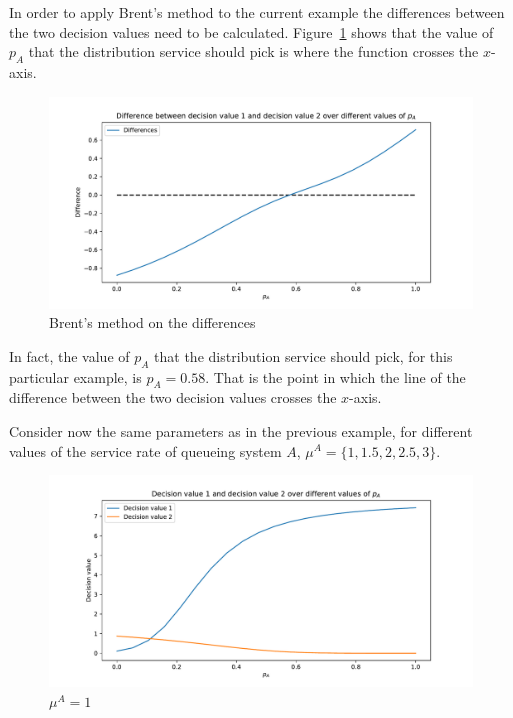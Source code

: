 In order to apply Brent's method to the current example the differences between
the two decision values need to be calculated.
Figure~\ref{fig:brent_method_diffs} shows that the value of \(p_A\) that the
distribution service should pick is where the function crosses the \(x\)-axis.

\begin{figure}[H]
    \centering
    \includegraphics[width=\textwidth]{chapters/04_game_theoretic_model/img/brents_method/brent_method_diffs.pdf}
    \caption{Brent's method on the differences}
    \label{fig:brent_method_diffs}
\end{figure}

In fact, the value of \(p_A\) that the distribution service should pick, for
this particular example, is \(p_A = 0.58\).
That is the point in which the line of the difference between the two decision
values crosses the \(x\)-axis.

Consider now the same parameters as in the previous example, for different
values of the service rate of queueing system \(A\), \(\mu^A =
\{1,1.5,2,2.5,3\}\).

\begin{figure}[H]
    \centering
    \includegraphics[width=\textwidth]{chapters/04_game_theoretic_model/img/brents_method/brent_method_example_mu_A_1.0.pdf}
    \caption{\(\mu^A = 1\)}
    \label{fig:brent_method_example_mu_A_1}
\end{figure}

